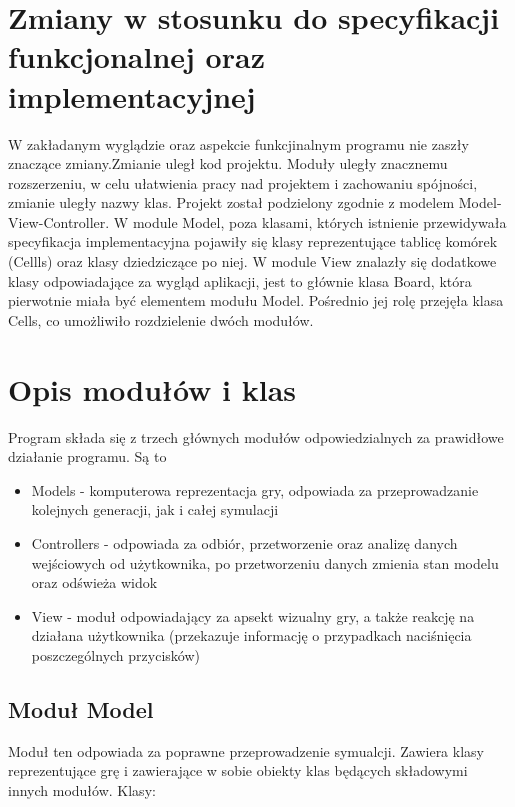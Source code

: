 \documentclass[10pt, oneside]{article}
\begin{document}
\section {Zmiany w stosunku do specyfikacji funkcjonalnej oraz  implementacyjnej }
W zakładanym wyglądzie oraz  aspekcie funkcjinalnym programu nie zaszły znaczące zmiany.Zmianie uległ kod projektu. Moduły uległy znacznemu rozszerzeniu, w celu ułatwienia pracy nad projektem i zachowaniu spójności, zmianie uległy nazwy klas. Projekt został podzielony zgodnie z modelem Model-View-Controller. W module Model, poza klasami, których istnienie przewidywała specyfikacja implementacyjna pojawiły się klasy reprezentujące tablicę komórek (Cellls) oraz klasy dziedziczące po niej. W module View znalazły się dodatkowe klasy odpowiadające za wygląd aplikacji, jest to głównie klasa Board, która pierwotnie miała być elementem modułu Model. Pośrednio jej rolę przejęła klasa Cells, co umożliwiło rozdzielenie dwóch modułów.

\section {Opis modułów i klas}
Program składa się z trzech głównych modułów odpowiedzialnych za prawidłowe działanie programu. Są to
\begin {itemize}
\item Models - komputerowa reprezentacja gry, odpowiada za przeprowadzanie kolejnych generacji, jak i całej symulacji
\item Controllers - odpowiada za odbiór, przetworzenie oraz analizę danych wejściowych od użytkownika, po przetworzeniu danych zmienia stan modelu oraz odświeża widok
\item View - moduł odpowiadający za apsekt wizualny gry, a także reakcję na działana użytkownika (przekazuje informację o przypadkach naciśnięcia poszczególnych przycisków)
\end{itemize}

\subsection {Moduł Model}
Moduł ten odpowiada za poprawne przeprowadzenie symualcji. Zawiera klasy reprezentujące grę i zawierające w sobie obiekty klas będących składowymi innych modułów.
Klasy:
\end{document}
